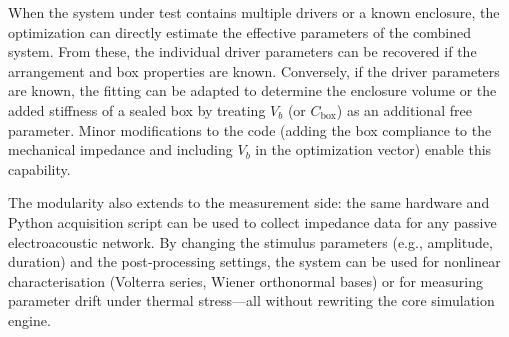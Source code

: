 When the system under test contains multiple drivers or a known enclosure, the optimization can directly estimate the effective parameters of the combined system. From these, the individual driver parameters can be recovered if the arrangement and box properties are known. Conversely, if the driver parameters are known, the fitting can be adapted to determine the enclosure volume or the added stiffness of a sealed box by treating $V_b$ (or $C_{\text{box}}$) as an additional free parameter. Minor modifications to the code (adding the box compliance to the mechanical impedance and including $V_b$ in the optimization vector) enable this capability.

The modularity also extends to the measurement side: the same hardware and Python acquisition script can be used to collect impedance data for any passive electroacoustic network. By changing the stimulus parameters (e.g., amplitude, duration) and the post‑processing settings, the system can be used for nonlinear characterisation (Volterra series, Wiener orthonormal bases) or for measuring parameter drift under thermal stress—all without rewriting the core simulation engine.
